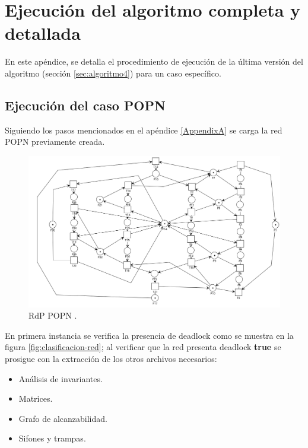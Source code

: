 
\chapter{Ejecución del algoritmo completa y detallada} %

\label{AppendixB} %
En este apéndice, se detalla el procedimiento de ejecución de la última versión del algoritmo (sección \ref{sec:algoritmo4}) para un caso específico. 


\section{Ejecución del caso POPN}

Siguiendo los pasos mencionados en el apéndice \ref{AppendixA} se carga la red POPN previamente creada. 

\begin{figure}[H]
	\centering
	\includegraphics[scale=0.45]{Figures/apendiceB/POPN_DEADLOCK.png}
	\caption[RdP POPN]{RdP POPN \cite{libropopn}.}
	\label{fig:popndeadlocktrue}
 \end{figure}

En primera instancia se verifica la presencia de deadlock como se muestra en la figura \ref{fig:clasificacion-red}; al verificar que la red presenta deadlock \textbf{true} se prosigue con la extracción de los otros archivos necesarios:
\begin{itemize}
    \item Análisis de invariantes.
    \item Matrices.
    \item Grafo de alcanzabilidad.
    \item Sifones y trampas.
\end{itemize}

